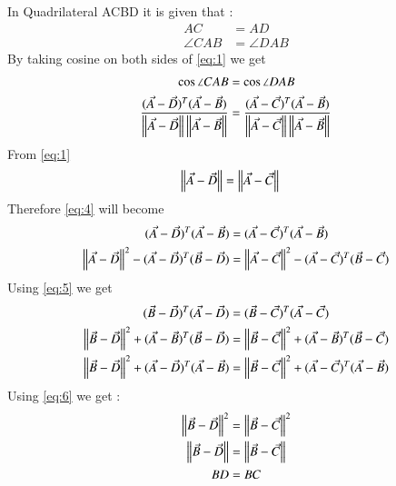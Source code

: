 \documentclass[journal,12pt,twocolumn]{IEEEtran}
\begin{document}
In Quadrilateral ACBD it is given that :
\begin{align}
    AC&=AD \label{eq:1}\\ 
\angle{CAB}&=\angle{DAB} \label{eq:2}
\end{align}
By taking cosine on both sides of \eqref{eq:1} we get
\begin{align}
    \cos{\angle{CAB}}&=\cos{\angle{DAB}}\\
    \frac{(\Vec{A}-\Vec{D})^T(\Vec{A}-\Vec{B})}{\left\lVert\Vec{A}-\Vec{D}\right\rVert\left\lVert\Vec{A}-\Vec{B}\right\rVert} &= \frac{(\Vec{A}-\Vec{C})^T(\Vec{A}-\Vec{B})}{\left\lVert\Vec{A}-\Vec{C}\right\rVert\left\lVert\Vec{A}-\Vec{B}\right\rVert} \label{eq:4}
\end{align}
From \eqref{eq:1}
\begin{align}
    \left\lVert\Vec{A}-\Vec{D}\right\rVert&=\left\lVert\Vec{A}-\Vec{C}\right\rVert\label{eq:5}
\end{align}
Therefore \eqref{eq:4} will become 
\begin{align}
(\Vec{A}-\Vec{D})^T(\Vec{A}-\Vec{B})&=(\Vec{A}-\Vec{C})^T(\Vec{A}-\Vec{B})\label{eq:6}\\
\left\lVert\Vec{A}-\Vec{D}\right\rVert^2-(\Vec{A}-\Vec{D})^T(\Vec{B}-\Vec{D})&=\left\lVert\Vec{A}-\Vec{C}\right\rVert^2-(\Vec{A}-\Vec{C})^T(\Vec{B}-\Vec{C})
\end{align}
Using \eqref{eq:5} we get
\begin{align}
(\Vec{B}-\Vec{D})^T(\Vec{A}-\Vec{D})&=(\Vec{B}-\Vec{C})^T(\Vec{A}-\Vec{C})\\
\left\lVert\Vec{B}-\Vec{D}\right\rVert^2+(\Vec{A}-\Vec{B})^T(\Vec{B}-\Vec{D})&=\left\lVert\Vec{B}-\Vec{C}\right\rVert^2+(\Vec{A}-\Vec{B})^T(\Vec{B}-\Vec{C})\\
\left\lVert\Vec{B}-\Vec{D}\right\rVert^2+(\Vec{A}-\Vec{D})^T(\Vec{A}-\Vec{B})&=\left\lVert\Vec{B}-\Vec{C}\right\rVert^2+(\Vec{A}-\Vec{C})^T(\Vec{A}-\Vec{B})\label{eq:10}
\end{align}
Using \eqref{eq:6}  we get : 
\begin{align}
 \left\lVert\Vec{B}-\Vec{D}\right\rVert^2 &= \left\lVert\Vec{B}-\Vec{C}\right\rVert^2\\
 \left\lVert\Vec{B}-\Vec{D}\right\rVert &= \left\lVert\Vec{B}-\Vec{C}\right\rVert\\
 BD&=BC
\end{align}
\end{document}
